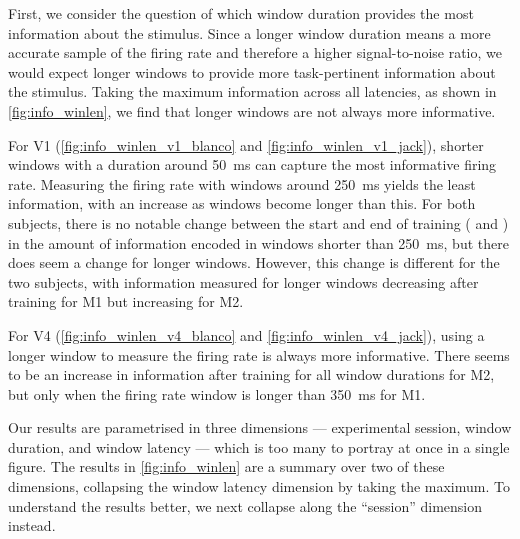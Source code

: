 First, we consider the question of which window duration provides the most information about the stimulus.
Since a longer window duration means a more accurate sample of the firing rate and therefore a higher signal-to-noise ratio, we would expect longer windows to provide more task-pertinent information about the stimulus.
Taking the maximum information across all latencies, as shown in \autoref{fig:info_winlen}, we find that longer windows are not always more informative.

For \ac{V1} (\autoref{fig:info_winlen_v1_blanco} and \autoref{fig:info_winlen_v1_jack}), shorter windows with a duration around \SI{50}{\milli\second} can capture the most informative firing rate.
Measuring the firing rate with windows around \SI{250}{\milli\second} yields the least information, with an increase as windows become longer than this.
For both subjects, there is no notable change between the start and end of training ( and ) in the amount of information encoded in windows shorter than \SI{250}{\milli\second}, but there does seem a change for longer windows.
However, this change is different for the two subjects, with information measured for longer windows decreasing after training for \ac{M1} but increasing for \ac{M2}.

For \ac{V4} (\autoref{fig:info_winlen_v4_blanco} and \autoref{fig:info_winlen_v4_jack}), using a longer window to measure the firing rate is always more informative.
There seems to be an increase in information after training for all window durations for \ac{M2}, but only when the firing rate window is longer than \SI{350}{\milli\second} for \ac{M1}.

Our results are parametrised in three dimensions --- experimental session, window duration, and window latency --- which is too many to portray at once in a single figure.
The results in \autoref{fig:info_winlen} are a summary over two of these dimensions, collapsing the window latency dimension by taking the maximum.
To understand the results better, we next collapse along the ``session'' dimension instead.

